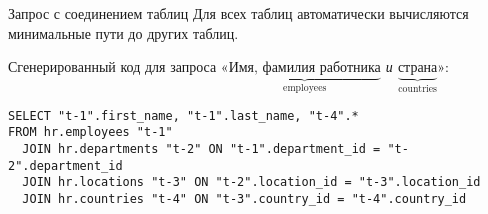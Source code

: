 \begin{frame}[fragile]{Запрос с соединением таблиц}%
  Для всех таблиц автоматически вычисляются минимальные пути до других таблиц.

  Сгенерированный код для запроса «\textit{$ \underbrace{\text{Имя, фамилия работника}}_{\text{employees}} $ и $ \underbrace{\text{страна}}_{\text{countries}} $}»:

  \begin{verbatim}
SELECT "t-1".first_name, "t-1".last_name, "t-4".*
FROM hr.employees "t-1"
  JOIN hr.departments "t-2" ON "t-1".department_id = "t-2".department_id
  JOIN hr.locations "t-3" ON "t-2".location_id = "t-3".location_id
  JOIN hr.countries "t-4" ON "t-3".country_id = "t-4".country_id
  \end{verbatim}

\end{frame}
